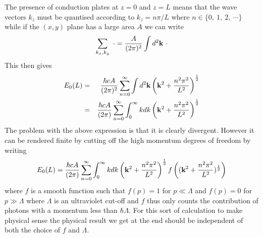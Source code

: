 The presence of conduction plates at $z=0$ and $z=L$ means that the wave vectors $k_z$
must be quantised according to $k_z= n\pi/L$ where $n \in \{0,\ 1, \ 2, \ \cdots\}$ while
if the $(x,y)$ plane has a large area $A$ we can write
\begin{equation}
\sum_{k_x,k_y}\ \cdot= {A\over (2\pi)^2}\int  d^2{\bf k} \ \cdot
\end{equation}
This then gives 
\begin{eqnarray}
E_0(L) &=& {\hbar c A\over (2\pi)^2}\sum_{n=0}^\infty  \int  d^2{\bf k} \left({\bf k}^2 + {n^2\pi^2\over L^2}\right)^{1\over 2} \\
&=& {\hbar c A\over (2\pi)}\sum_{n=0}^\infty  \int_0^\infty  kdk \left({\bf k}^2 + {n^2\pi^2\over L^2}\right)^{1\over 2}
\end{eqnarray}
The problem with the above expression is that it is clearly divergent. However it can be rendered finite by cutting off the high momentum degrees of freedom by writing
\begin{equation}
E_0(L) = {\hbar c A\over (2\pi)}\sum_{n=0}^\infty  \int_0^\infty  kdk \left({\bf k}^2 + {n^2\pi^2\over L^2}\right)^{1\over 2} f\left(({\bf k}^2 + {n^2\pi^2\over L^2})^{1\over 2}\right)
\end{equation}
where $f$ is a smooth function such that $f(p)=1$ for $p\ll\Lambda$ and $f(p)=0$ for $p\gg\Lambda$ where $\Lambda$ is an ultraviolet cut-off and $f$ thus only counts the contribution of photons with a momentum less than $\hbar\Lambda$. For this sort of calculation to make physical sense the physical result we get at the end should be independent of both the choice of $f$ and $\Lambda$. 




